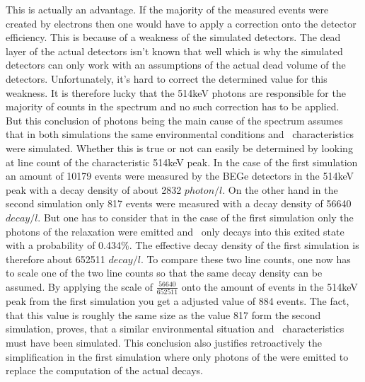 This is actually an advantage.
If the majority of the measured events were created by electrons then one would have to apply a correction onto the detector efficiency.
This is because of a weakness of the simulated detectors.
The dead layer of the actual detectors isn't known that well which is why the simulated detectors can only work with an assumptions of the actual dead volume of the detectors.
Unfortunately, it's hard to correct the determined value for this weakness.
It is therefore lucky that the 514keV photons are responsible for the majority of counts in the spectrum and no such correction has to be applied.
\\

But this conclusion of photons being the main cause of the spectrum assumes that in both simulations the same environmental conditions and \Kr\ characteristics were simulated.
Whether this is true or not can easily be determined by looking at line count of the characteristic 514keV peak.
In the case of the first simulation an amount of 10179 events were measured by the BEGe detectors in the 514keV peak with a decay density of about 2832 $\unit{photon}/\unit{l}$.
On the other hand in the second simulation only 817 events were measured with a decay density of 56640$\unit{decay}/\unit{l}$.
But one has to consider that in the case of the first simulation only the photons of the  relaxation were emitted and \Kr\ only decays into this exited state with a probability of 0.434$\%$.
The effective decay density of the first simulation is therefore about 652511 $\unit{decay}/\unit{l}$.
To compare these two line counts, one now has to scale one of the two line counts so that the same decay density can be assumed.
By applying the scale of $\frac{56640}{652511}$ onto the amount of events in the 514keV peak from the first simulation you get a adjusted value of 884 events.
The fact, that this value is roughly the same size as the value 817 form the second simulation, proves, that a similar environmental situation and \Kr\ characteristics must have been simulated.
This conclusion also justifies retroactively the simplification in the first simulation where only photons of the  were emitted to replace the computation of the actual decays.
\\

